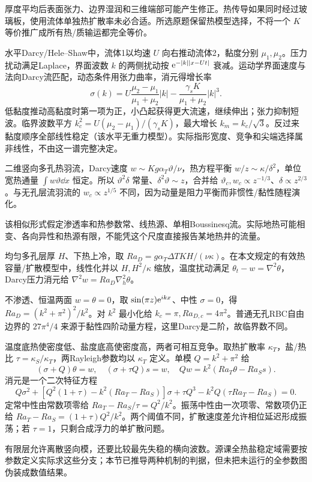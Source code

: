 厚度平均后表面张力、边界湿润和三维端部可能产生修正。热传导如果同时经过玻璃板，使用流体单独热扩散率未必合适。所选原题保留热模型选择，不将一个 $K$ 等价推广成所有热/质输运都完全等价。

水平Darcy/Hele--Shaw中，流体1以均速 $U$ 向右推动流体2，黏度分别 $\mu_1,\mu_2$。压力扰动满足Laplace，界面波数 $k$ 的两侧扰动按 $\mathrm e^{-|k||x-Ut|}$ 衰减。运动学界面速度与法向Darcy流匹配，动态条件用张力曲率，消元得增长率
\[
\sigma(k)=U\frac{\mu_2-\mu_1}{\mu_1+\mu_2}|k|
-\frac{\gamma_s K}{\mu_1+\mu_2}|k|^3.
\]
低黏度推动高黏度时第一项为正，小凸起获得更大流速，继续伸出；张力抑制短波。临界波数平方 $k_c^2=U(\mu_2-\mu_1)/(\gamma_sK)$，最大增长 $k_m=k_c/\sqrt3$。反过来黏度顺序全部线性稳定（该水平无重力模型）。实际指形宽度、竞争和尖端选择属非线性，不由这一谱完整决定。

二维竖向多孔热羽流，Darcy速度 $w\sim K g\alpha_T\vartheta/\nu$，热方程平衡 $w/z\sim\kappa/\delta^2$，单位宽热通量 $\int w\vartheta\dd x$ 恒定。所以 $\vartheta^2\delta$ 常量、$\delta^2\vartheta\sim z$，合并给 $\vartheta_c,w_c\propto z^{-1/3}$、$\delta\propto z^{2/3}$。与无孔层流羽流的 $w_c\propto z^{1/5}$ 不同，因为动量是阻力平衡而非惯性/黏性随程演化。

该相似形式假定渗透率和热参数常、线热源、单相Boussinesq流。实际地热可能相变、各向异性和热源有限，不能凭这个尺度直接报告某地热井的流量。

均匀多孔层厚 $H$、下热上冷，取 $Ra_D=g\alpha_T\Delta T K H/(\nu\kappa)$。在本文规定的有效热容量/扩散模型中，线性化并以 $H,H^2/\kappa$ 缩放，温度扰动满足 $\theta_t-w=\nabla^2\theta$，Darcy压力消元给 $\nabla^2w=Ra_D\nabla_h^2\theta$。

不渗透、恒温两面 $w=\theta=0$，取 $\sin(\pi z)\mathrm e^{ikx}$、中性 $\sigma=0$，得 $Ra_D=(k^2+\pi^2)^2/k^2$。对 $k^2$ 最小化给 $k_c=\pi,Ra_{D,c}=4\pi^2$。普通无孔RBC自由边界的 $27\pi^4/4$ 来源于黏性四阶动量方程，这里Darcy是二阶，故临界数不同。

温度底热使密度低、盐度底高使密度高，两者可相互竞争。取热扩散率 $\kappa_T$，盐/热比 $\tau=\kappa_S/\kappa_T$，两Rayleigh参数均以 $\kappa_T$ 定义。单模 $Q=k^2+\pi^2$ 给
\[
(\sigma+Q)\theta=w,\quad(\sigma+\tau Q)s=w,\quad
Qw=k^2(Ra_T\theta-Ra_Ss).
\]
消元是一个二次特征方程
\[
Q\sigma^2+[Q^2(1+\tau)-k^2(Ra_T-Ra_S)]\sigma
+\tau Q^3-k^2Q(\tau Ra_T-Ra_S)=0.
\]
定常中性由常数项零给 $Ra_T-Ra_S/\tau=Q^2/k^2$。振荡中性由一次项零、常数项仍正给 $Ra_T-Ra_S=(1+\tau)Q^2/k^2$。两个阈值不同，扩散速度差允许相位延迟形成振荡；若 $\tau=1$，只剩合成浮力的单扩散问题。

有限层允许离散竖向模，还要比较最先失稳的横向波数。源课全热盐稳定域需要按参数定义实际求这些分支；本节已推导两种机制的判据，但未把未运行的全参数图伪装成数值结果。
